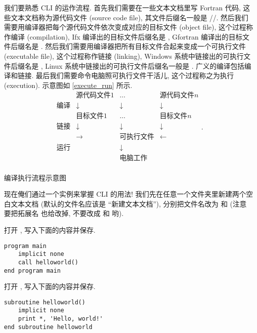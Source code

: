 我们要熟悉 CLI 的运作流程. 首先我们需要在一些文本文档里写 Fortran 代码, 这些文本文档称为源代码文件 (source code file), 其文件后缀名一般是 //. 然后我们需要用编译器把每个源代码文件依次变成对应的目标文件 (object file), 这个过程称作编译 (compilation), Ifx 编译出的目标文件后缀名是 , Gfortran 编译出的目标文件后缀名是 . 然后我们需要用编译器把所有目标文件合起来变成一个可执行文件 (executable file), 这个过程称作链接 (linking), Windows 系统中链接出的可执行文件后缀名是 , Linux 系统中链接出的可执行文件后缀名一般是 . 广义的编译包括编译和链接. 最后我们需要命令电脑照可执行文件干活儿, 这个过程称之为执行 (execution). 示意图如 \ref{execute_run} 所示.
\def\la{\leftarrow}
\def\ra{\rightarrow}
\def\da{\downarrow}
\begin{equation}
    \begin{matrix}
        & \text{源代码文件}1  & \dots & \text{源代码文件}n \\
        \text{编译} & \da  & \da & \da \\
        & \text{目标文件}1  & \dots & \text{目标文件}n \\
        \text{链接} & \da & \da & \da \\
        & \ra & \text{可执行文件} & \la \\
        \text{运行} & & \da &  \\
        & & \text{电脑工作} & \\
    \end{matrix}.\label{execute_run}
\end{equation}
\begin{center}
    编译执行流程示意图
\end{center}

现在俺们通过一个实例来掌握 CLI 的用法! 我们先在任意一个文件夹里新建两个空白文本文档 (默认的文件名应该是 ``\textsf{新建}\ttt{\ }\textsf{文本文档}''), 分别把文件名改为  和  (注意要把拓展名  也给改掉, 不要改成  和  哟).

打开 , 写入下面的内容并保存.
\begin{lstlisting}
program main
    implicit none
    call helloworld()
end program main
\end{lstlisting}

打开 , 写入下面的内容并保存.
\begin{lstlisting}
subroutine helloworld()
    implicit none
    print *, 'Hello, world!'
end subroutine helloworld
\end{lstlisting}

